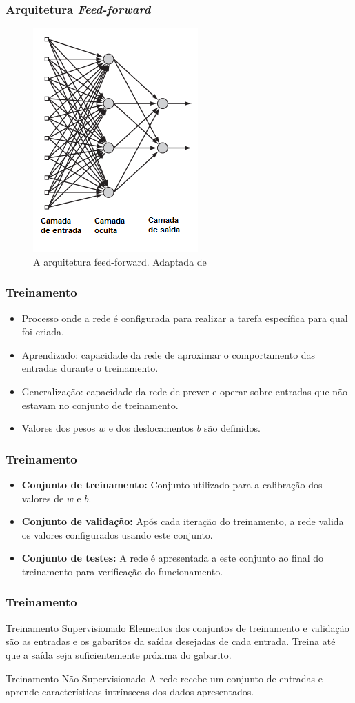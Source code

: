\documentclass{beamer}
\begin{document}
\begin{frame}
\frametitle{Arquitetura \textit{Feed-forward}}
\begin{figure}
\centering
\includegraphics[width=.3\textwidth]{feedforward}
\caption{A arquitetura feed-forward. Adaptada de \cite{Haykin}}
\end{figure}
\end{frame}

\begin{frame}
\frametitle{Treinamento}
\begin{itemize}
\item Processo onde a rede é configurada para realizar a tarefa específica para qual foi criada.
\item Aprendizado: capacidade da rede de aproximar o comportamento das entradas durante o treinamento.
\item Generalização: capacidade da rede de prever e operar sobre entradas que não estavam no conjunto de treinamento.
\item Valores dos pesos $w$ e dos deslocamentos $b$ são definidos.
\end{itemize}
\end{frame}

\begin{frame}
\frametitle{Treinamento}
\begin{itemize}
\item \textbf{Conjunto de treinamento:} Conjunto utilizado para a calibração dos valores de $w$ e $b$.
\item \textbf{Conjunto de validação:} Após cada iteração do treinamento, a rede valida os valores configurados usando este conjunto.
\item \textbf{Conjunto de testes:} A rede é apresentada a este conjunto ao final do treinamento para verificação do funcionamento.
\end{itemize}
\end{frame}

\begin{frame}
\frametitle{Treinamento}
\begin{block}{Treinamento Supervisionado}
Elementos dos conjuntos de treinamento e validação são as entradas e os gabaritos da saídas desejadas de cada entrada. Treina até que a saída seja suficientemente próxima do gabarito.
\end{block}

\begin{block}{Treinamento Não-Supervisionado}
A rede recebe um conjunto de entradas e aprende características intrínsecas dos dados apresentados.
\end{block}

\end{frame}
\end{document}
